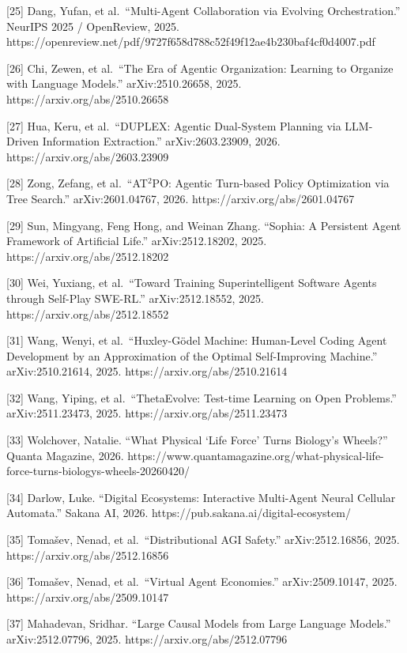 {[}25{]} Dang, Yufan, et al.~``Multi-Agent Collaboration via Evolving
Orchestration.'' NeurIPS 2025 / OpenReview, 2025.
https://openreview.net/pdf/9727f658d788c52f49f12ae4b230baf4cf0d4007.pdf

{[}26{]} Chi, Zewen, et al.~``The Era of Agentic Organization: Learning
to Organize with Language Models.'' arXiv:2510.26658, 2025.
https://arxiv.org/abs/2510.26658

{[}27{]} Hua, Keru, et al.~``DUPLEX: Agentic Dual-System Planning via
LLM-Driven Information Extraction.'' arXiv:2603.23909, 2026.
https://arxiv.org/abs/2603.23909

{[}28{]} Zong, Zefang, et al.~``AT\(^2\)PO: Agentic Turn-based Policy
Optimization via Tree Search.'' arXiv:2601.04767, 2026.
https://arxiv.org/abs/2601.04767

{[}29{]} Sun, Mingyang, Feng Hong, and Weinan Zhang. ``Sophia: A
Persistent Agent Framework of Artificial Life.'' arXiv:2512.18202, 2025.
https://arxiv.org/abs/2512.18202

{[}30{]} Wei, Yuxiang, et al.~``Toward Training Superintelligent
Software Agents through Self-Play SWE-RL.'' arXiv:2512.18552, 2025.
https://arxiv.org/abs/2512.18552

{[}31{]} Wang, Wenyi, et al.~``Huxley-Gödel Machine: Human-Level Coding
Agent Development by an Approximation of the Optimal Self-Improving
Machine.'' arXiv:2510.21614, 2025. https://arxiv.org/abs/2510.21614

{[}32{]} Wang, Yiping, et al.~``ThetaEvolve: Test-time Learning on Open
Problems.'' arXiv:2511.23473, 2025. https://arxiv.org/abs/2511.23473

{[}33{]} Wolchover, Natalie. ``What Physical `Life Force' Turns
Biology's Wheels?'' Quanta Magazine, 2026.
https://www.quantamagazine.org/what-physical-life-force-turns-biologys-wheels-20260420/

{[}34{]} Darlow, Luke. ``Digital Ecosystems: Interactive Multi-Agent
Neural Cellular Automata.'' Sakana AI, 2026.
https://pub.sakana.ai/digital-ecosystem/

{[}35{]} Tomašev, Nenad, et al.~``Distributional AGI Safety.''
arXiv:2512.16856, 2025. https://arxiv.org/abs/2512.16856

{[}36{]} Tomašev, Nenad, et al.~``Virtual Agent Economies.''
arXiv:2509.10147, 2025. https://arxiv.org/abs/2509.10147

{[}37{]} Mahadevan, Sridhar. ``Large Causal Models from Large Language
Models.'' arXiv:2512.07796, 2025. https://arxiv.org/abs/2512.07796

